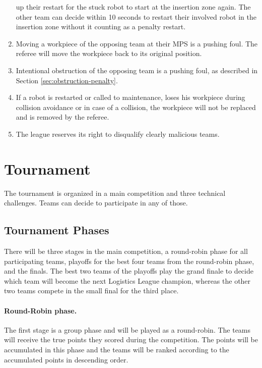 \documentclass[12pt,twoside]{article}
\begin{document}
\begin{enumerate}
  up their restart for the stuck robot to start at the insertion zone
  again. The other team can decide within 10 seconds to restart their
  involved robot in the insertion zone without it counting as a
  penalty restart.
\item Moving a workpiece of the opposing team at their MPS is a pushing 
foul. The referee will move the workpiece back to its original position.
\item Intentional obstruction of the opposing team is a pushing foul, as 
described in Section \ref{sec:obstruction-penalty}.
\item If a robot is restarted or called to maintenance, loses his 
workpiece during collision avoidance or in case of a collision, the 
workpiece will not be replaced and is removed by the referee.
\item The league reserves its right to disqualify clearly malicious
  teams.
\end{enumerate}

\section{Tournament}
\label{sec:tournament}
The tournament is organized in a main competition and three technical
challenges. Teams can decide to participate in any of those.

\subsection{Tournament Phases}
\label{sec:tournament-phases}
There will be three stages in the main competition, a round-robin
phase for all participating teams, playoffs for the best four teams
from the round-robin phase, and the finals. The best two teams of the
playoffs play the grand finale to decide which team will become the
next Logistics League champion, whereas the other two teams compete in
the small final for the third place.

\paragraph{Round-Robin phase.~} 
The first stage is a group phase and will be played as a round-robin.
The teams will receive the true points they scored during the
competition. The points will be accumulated in this phase and the
teams will be ranked according to the accumulated points in descending
order.
\end{document}
